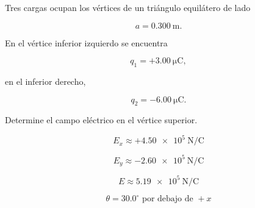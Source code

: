 \begin{ejercicio}

Tres cargas ocupan los vértices de un triángulo equilátero de lado

\[
a=\SI{0.300}{\metre}.
\]

En el vértice inferior izquierdo se encuentra

\[
q_1=+\SI{3.00}{\micro\coulomb},
\]

en el inferior derecho,

\[
q_2=-\SI{6.00}{\micro\coulomb}.
\]

Determine el campo eléctrico en el vértice superior.

\end{ejercicio}

\begin{respuesta}

\[
\boxed{E_x\approx+\SI{4.50e5}{\newton\per\coulomb}}
\]

\[
\boxed{E_y\approx-\SI{2.60e5}{\newton\per\coulomb}}
\]

\[
\boxed{E\approx\SI{5.19e5}{\newton\per\coulomb}}
\]

\[
\boxed{\theta=30.0^\circ\text{ por debajo de }+x}
\]

\end{respuesta}

